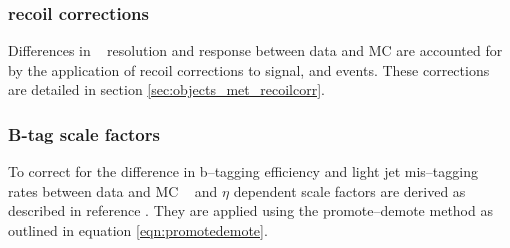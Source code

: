 \subsubsection*{\MET recoil corrections}
Differences in \MET~ resolution and response between data and \ac{MC} 
are accounted for by the application of recoil corrections
to signal, \Wjets and \Ztautau events. These corrections
are detailed in section \ref{sec:objects_met_recoilcorr}.
\subsubsection*{B-tag scale factors}
To correct for the difference in b--tagging efficiency
and light jet mis--tagging rates between data and \ac{MC}
\pT~ and $\eta$ dependent scale factors are derived as 
described in reference \cite{cms-btag-run2}. They 
are applied using the promote--demote method
as outlined in equation \ref{eqn:promotedemote}.
